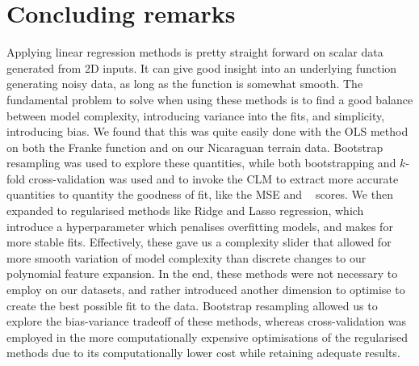 \documentclass[twocolumn,english,notitlepage]{article}
\DeclareMathOperator{\Rsquared}{R^2}
\begin{document}
\section{Concluding remarks}
    Applying linear regression methods is pretty straight forward on scalar data generated from 2D inputs. It can give good insight into an underlying function generating noisy data, as long as the function is somewhat smooth. The fundamental problem to solve when using these methods is to find a good balance between model complexity, introducing variance into the fits, and simplicity, introducing bias. We found that this was quite easily done with the OLS method on both the Franke function and on our Nicaraguan terrain data. Bootstrap resampling was used to explore these quantities, while both bootstrapping and $k$-fold cross-validation was used and to invoke the CLM to extract more accurate quantities to quantity the goodness of fit, like the MSE and $\Rsquared$ scores. We then expanded to regularised methods like Ridge and Lasso regression, which introduce a hyperparameter which penalises overfitting models, and makes for more stable fits. Effectively, these gave us a complexity slider that allowed for more smooth variation of model complexity than discrete changes to our polynomial feature expansion. In the end, these methods were not necessary to employ on our datasets, and rather introduced another dimension to optimise to create the best possible fit to the data. Bootstrap resampling allowed us to explore the bias-variance tradeoff of these methods, whereas cross-validation was employed in the more computationally expensive optimisations of the regularised methods due to its computationally lower cost while retaining adequate results.
\end{document}
